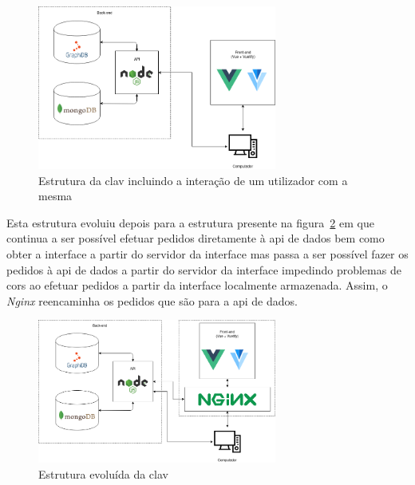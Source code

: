 \begin{figure}[H]
    \begin{center}
        \includegraphics[width=0.7\textwidth]{img/clav_struct.png}
    \end{center}
    \caption{Estrutura da \acrshort{clav} incluindo a interação de um utilizador com a mesma}\label{fig:clav_struct}
\end{figure}

Esta estrutura evoluiu depois para a estrutura presente na figura~\ref{fig:clav_struct2} em que continua a ser possível efetuar pedidos diretamente à \acrshort{api} de dados bem como obter a interface a partir do servidor da interface mas passa a ser possível fazer os pedidos à \acrshort{api} de dados a partir do servidor da interface impedindo problemas de \acrshort{cors} ao efetuar pedidos a partir da interface localmente armazenada. Assim, o \textit{Nginx} reencaminha os pedidos que são para a \acrshort{api} de dados.

\begin{figure}[H]
    \begin{center}
        \includegraphics[width=0.7\textwidth]{img/clav_struct2.png}
    \end{center}
    \caption{Estrutura evoluída da \acrshort{clav}}\label{fig:clav_struct2}
\end{figure}

